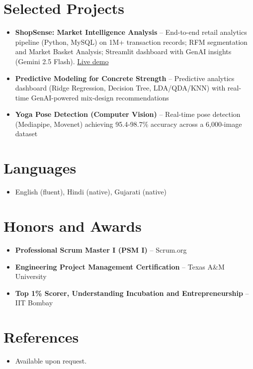 \documentclass[11pt,a4paper,sans]{moderncv}
\begin{document}
\section{Selected Projects}
\vspace{1pt}
\begin{itemize}
\item \textbf{ShopSense: Market Intelligence Analysis} -- End-to-end retail analytics pipeline (Python, MySQL) on 1M+ transaction records; RFM segmentation and Market Basket Analysis; Streamlit dashboard with GenAI insights (Gemini 2.5 Flash). \href{https://harsh-retail-analytics-project.streamlit.app}{Live demo}
\item \textbf{Predictive Modeling for Concrete Strength} -- Predictive analytics dashboard (Ridge Regression, Decision Tree, LDA/QDA/KNN) with real-time GenAI-powered mix-design recommendations
\item \textbf{Yoga Pose Detection (Computer Vision)} -- Real-time pose detection (Mediapipe, Movenet) achieving 95.4-98.7\% accuracy across a 6,000-image dataset
\end{itemize}


\section{Languages}
\vspace{1pt}
\begin{itemize}
\item English (fluent), Hindi (native), Gujarati (native)
\end{itemize}


\section{Honors and Awards}
\vspace{1pt}
\begin{itemize}
\item{\textbf{Professional Scrum Master I (PSM I)} -- Scrum.org}
\item{\textbf{Engineering Project Management Certification} -- Texas A\&M University}
\item{\textbf{Top 1\% Scorer, Understanding Incubation and Entrepreneurship} -- IIT Bombay}
\end{itemize}


\section{References}
\vspace{1pt}
\begin{itemize}
\item{Available upon request.}
\end{itemize}
\end{document}
